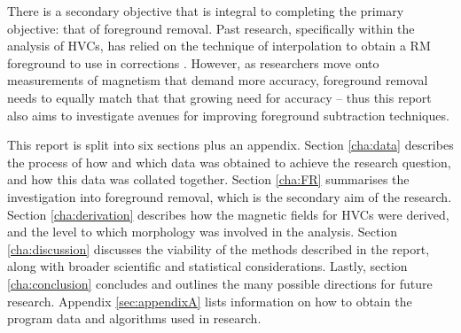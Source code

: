 There is a secondary objective that is integral to completing the primary objective: that of foreground removal. Past research, specifically within the analysis of HVCs, has relied on the technique of interpolation to obtain a RM foreground to use in corrections \citep{ID21, ID3, ID26}. However, as researchers move onto measurements of magnetism that demand more accuracy, foreground removal needs to equally match that that growing need for accuracy – thus this report also aims to investigate avenues for improving foreground subtraction techniques.


This report is split into six sections plus an appendix. Section \ref{cha:data} describes the process of how and which data was obtained to achieve the research question, and how this data was collated together. Section \ref{cha:FR} summarises the investigation into foreground removal, which is the secondary aim of the research. Section \ref{cha:derivation} describes how the magnetic fields for HVCs were derived, and the level to which morphology was involved in the analysis. Section \ref{cha:discussion} discusses the viability of the methods described in the report, along with broader scientific and statistical considerations. Lastly, section \ref{cha:conclusion} concludes and outlines the many possible directions for future research. Appendix \ref{sec:appendixA} lists information on how to obtain the program data and algorithms used in research.